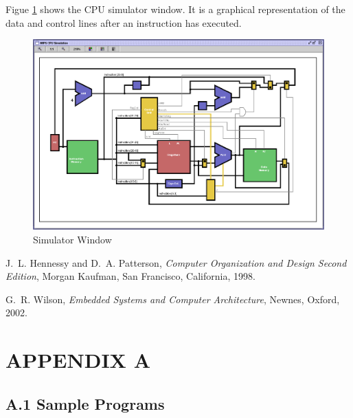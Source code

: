 \documentclass[]{spie}
\begin{document}
Figue \ref{fig:Simulator} shows the CPU simulator window. It is a graphical representation of the data and control lines after
an instruction has executed.  

\begin{figure}[H]
	\begin{center}
		\includegraphics{graphics/Simulator.eps}
	\end{center}
	\caption{\label{fig:Simulator} Simulator Window}
\end{figure}

%
\begin{thebibliography}{1}

J.~L. Hennessy and D.~A. Patterson, {\em Computer Organization and Design
  Second Edition}, Morgan Kaufman, San Francisco, California, 1998.

G.~R. Wilson, {\em Embedded Systems and Computer Architecture}, Newnes, Oxford,
  2002.

\end{thebibliography}

\section*{APPENDIX A}
\subsection*{A.1 Sample Programs}
\end{document}
